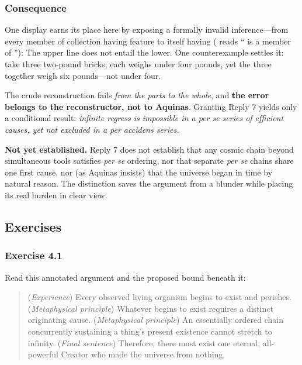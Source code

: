 \subsubsection*{Consequence}

One display earns its place here by exposing a formally invalid inference---from every member of collection  having feature  to  itself having  ( reads `` is a member of ''):
The upper line does not entail the lower. One counterexample settles it: take three two-pound bricks; each weighs under four pounds, yet the three together weigh six pounds---not under four.

The crude reconstruction fails \emph{from the parts to the whole}, and \textbf{the error belongs to the reconstructor, not to Aquinas}. Granting Reply 7 yields only a conditional result: \emph{infinite regress is impossible in a per se series of efficient causes, yet not excluded in a per accidens series.}

\textbf{Not yet established.} Reply 7 does not establish that any cosmic chain beyond simultaneous tools satisfies \emph{per se} ordering, nor that separate \emph{per se} chains share one first cause, nor (as Aquinas insists) that the universe began in time by natural reason. The distinction saves the argument from a blunder while placing its real burden in clear view.

\subsection{Exercises}

\subsubsection*{Exercise 4.1}

Read this annotated argument and the proposed bound beneath it:

\begin{quote}
(\emph{Experience}) Every observed living organism begins to exist and perishes. (\emph{Metaphysical principle}) Whatever begins to exist requires a distinct originating cause. (\emph{Metaphysical principle}) An essentially ordered chain concurrently sustaining a thing's present existence cannot stretch to infinity. (\emph{Final sentence}) Therefore, there must exist one eternal, all-powerful Creator who made the universe from nothing.
\end{quote}

